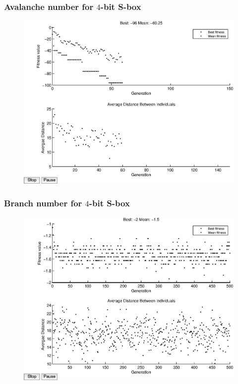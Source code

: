 \documentclass[handout]{beamer}
\begin{document}
\begin{frame}
	\frametitle{Avalanche number for $4$-bit S-box}
\begin{figure}
\centering
	\includegraphics[scale=0.5]{images/avalanche_results16.eps}
\end{figure}
\end{frame}

\begin{frame}
	\frametitle{Branch number for $4$-bit S-box}
\begin{figure}
	\centering
	\includegraphics[scale=0.5]{images/bn_results16.eps} 
\end{figure}
\end{frame}
\end{document}
